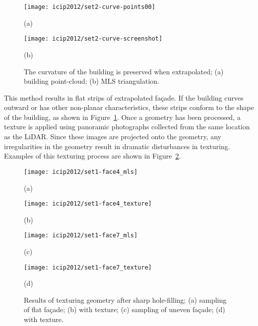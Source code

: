\documentclass[12pt,onecolumn,oneside]{book}
\begin{document}
\begin{figure}

\begin{minipage}[b]{0.5\linewidth}
  \centering
  \centerline{\texttt{[image: icip2012/set2-curve-points00]}}
  \centerline{(a)}\medskip
\end{minipage}
\hfill
\begin{minipage}[b]{0.5\linewidth}
  \centering
  \centerline{\texttt{[image: icip2012/set2-curve-screenshot]}}
  \centerline{(b)}\medskip
\end{minipage}
%
\caption[Surface reconstruction of building fa\c{c}ade.]{The curvature of the building is preserved when extrapolated; (a) building point-cloud; (b) MLS triangulation.}
\label{fig:extrapolate}
%
\end{figure}

This method results in flat strips of extrapolated fa\c{c}ade.  If the building curves outward or has other non-planar characteristics, these strips conform to the shape of the building, as shown in Figure~\ref{fig:extrapolate}.  Once a geometry has been processed, a texture is applied using panoramic photographs collected from the same location as the LiDAR.  Since these images are projected onto the geometry, any irregularities in the geometry result in dramatic disturbances in texturing.  Examples of this texturing process are shown in Figure~\ref{fig:icip2012_texture}.

\begin{figure}[t]

\begin{minipage}[b]{.48\linewidth}
  \centering
  \centerline{\texttt{[image: icip2012/set1-face4\_mls]}}
  \centerline{(a)}\medskip
\end{minipage}
\hfill
\begin{minipage}[b]{.48\linewidth}
  \centering
  \centerline{\texttt{[image: icip2012/set1-face4\_texture]}}
  \centerline{(b)}\medskip
\end{minipage}
%
\begin{minipage}[b]{.48\linewidth}
  \centering
  \centerline{\texttt{[image: icip2012/set1-face7\_mls]}}
  \centerline{(c)}\medskip
\end{minipage}
\hfill
\begin{minipage}[b]{.48\linewidth}
  \centering
  \centerline{\texttt{[image: icip2012/set1-face7\_texture]}}
  \centerline{(d)}\medskip
\end{minipage}
\caption[Meshes of building fa\c{c}ades with texture.]{Results of texturing geometry after sharp hole-filling; (a) sampling of flat fa\c{c}ade; (b) with texture; (c) sampling of uneven fa\c{c}ade; (d) with texture.}
\label{fig:icip2012_texture}
\end{figure}
\end{document}
